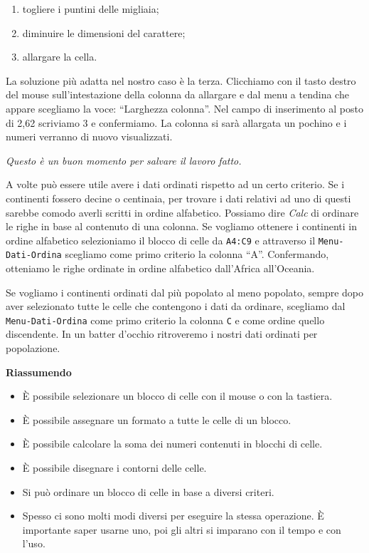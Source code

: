 \begin{enumerate} [noitemsep]
\item togliere i puntini delle migliaia;
\item diminuire le dimensioni del carattere;
\item allargare la cella.
\end{enumerate}

La soluzione più adatta nel nostro caso è la terza.
Clicchiamo con il tasto destro del mouse sull'intestazione della colonna da
allargare e dal menu a tendina che appare scegliamo la voce:
``Larghezza colonna''.
Nel campo di inserimento al posto di 2,62 scriviamo 3 e confermiamo.
La colonna si sarà allargata un pochino e i numeri verranno di nuovo
visualizzati.

\emph{Questo è un buon momento per salvare il lavoro fatto.}

A volte può essere utile avere i dati ordinati rispetto ad un certo criterio.
Se i continenti fossero decine o centinaia, per trovare i dati relativi ad
uno di questi sarebbe comodo averli scritti in ordine alfabetico.
Possiamo dire \emph{Calc} di ordinare le righe in base
al contenuto di una colonna.
Se vogliamo ottenere i continenti in ordine alfabetico selezioniamo il blocco
di celle da \texttt{A4:C9} e attraverso il \texttt{Menu-Dati-Ordina} scegliamo 
come
primo criterio la colonna ``A''.
Confermando, otteniamo le righe ordinate in ordine alfabetico dall'Africa
all'Oceania.

Se vogliamo i continenti ordinati dal più popolato al meno popolato, sempre
dopo aver selezionato tutte le celle che contengono i dati da ordinare,
scegliamo dal \texttt{Menu-Dati-Ordina} come primo criterio la colonna 
\texttt{C} e
come ordine quello discendente.
In un batter d'occhio ritroveremo i nostri dati ordinati per popolazione.

\textbf{Riassumendo}

\begin{itemize} [nosep]
\item È possibile selezionare un blocco di celle con il mouse o con la tastiera.
\item È possibile assegnare un formato a tutte le celle di un blocco.
\item È possibile calcolare la soma dei numeri contenuti in blocchi di celle.
\item È possibile disegnare i contorni delle celle.
\item Si può ordinare un blocco di celle in base a diversi criteri.
\item Spesso ci sono molti modi diversi per eseguire la stessa operazione.
È importante saper usarne uno, poi gli altri si imparano con il tempo e
con l'uso.
\end{itemize}

